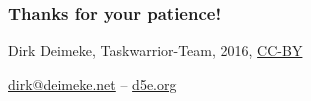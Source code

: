 \documentclass[t,handout]{beamer}
\begin{document}
\begin{frame}[fragile]\frametitle{Thanks for your patience!}
    \vfill
    \begin{center}
        Dirk Deimeke, Taskwarrior-Team, 2016, \href{https://creativecommons.org/licenses/by/4.0/}{CC-BY}

        \href{mailto:dirk@deimeke.net}{dirk@deimeke.net} -- \href{https://d5e.org/}{d5e.org}
    \end{center}
\end{frame}
\end{document}
